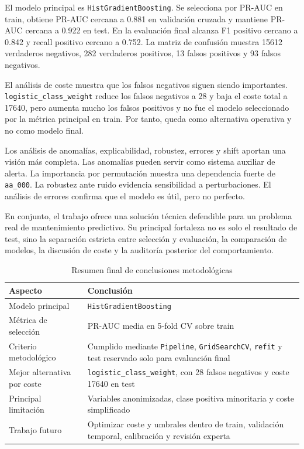 \documentclass[11pt,a4paper]{article}
\begin{document}
El modelo principal es \texttt{HistGradientBoosting}. Se selecciona por PR-AUC en train, obtiene PR-AUC cercana a 0.881 en validación cruzada y mantiene PR-AUC cercana a 0.922 en test. En la evaluación final alcanza F1 positivo cercano a 0.842 y recall positivo cercano a 0.752. La matriz de confusión muestra 15612 verdaderos negativos, 282 verdaderos positivos, 13 falsos positivos y 93 falsos negativos.

El análisis de coste muestra que los falsos negativos siguen siendo importantes. \texttt{logistic\_class\_weight} reduce los falsos negativos a 28 y baja el coste total a 17640, pero aumenta mucho los falsos positivos y no fue el modelo seleccionado por la métrica principal en train. Por tanto, queda como alternativa operativa y no como modelo final.

Los análisis de anomalías, explicabilidad, robustez, errores y shift aportan una visión más completa. Las anomalías pueden servir como sistema auxiliar de alerta. La importancia por permutación muestra una dependencia fuerte de \texttt{aa\_000}. La robustez ante ruido evidencia sensibilidad a perturbaciones. El análisis de errores confirma que el modelo es útil, pero no perfecto.

En conjunto, el trabajo ofrece una solución técnica defendible para un problema real de mantenimiento predictivo. Su principal fortaleza no es solo el resultado de test, sino la separación estricta entre selección y evaluación, la comparación de modelos, la discusión de coste y la auditoría posterior del comportamiento.

\begin{table}[H]
\centering
\caption{Resumen final de conclusiones metodológicas}
\label{tab_conclusiones_metodologicas}
\small
\begin{tabular}{@{}p{}p{}@{}}
\toprule
\textbf{Aspecto} & \textbf{Conclusión}\\
\midrule
Modelo principal & \texttt{HistGradientBoosting}\\
Métrica de selección & PR-AUC media en 5-fold CV sobre train\\
Criterio metodológico & Cumplido mediante \texttt{Pipeline}, \texttt{GridSearchCV}, \texttt{refit} y test reservado solo para evaluación final\\
Mejor alternativa por coste & \texttt{logistic\_class\_weight}, con 28 falsos negativos y coste 17640 en test\\
Principal limitación & Variables anonimizadas, clase positiva minoritaria y coste simplificado\\
Trabajo futuro & Optimizar coste y umbrales dentro de train, validación temporal, calibración y revisión experta\\
\bottomrule
\end{tabular}
\end{table}
\end{document}
